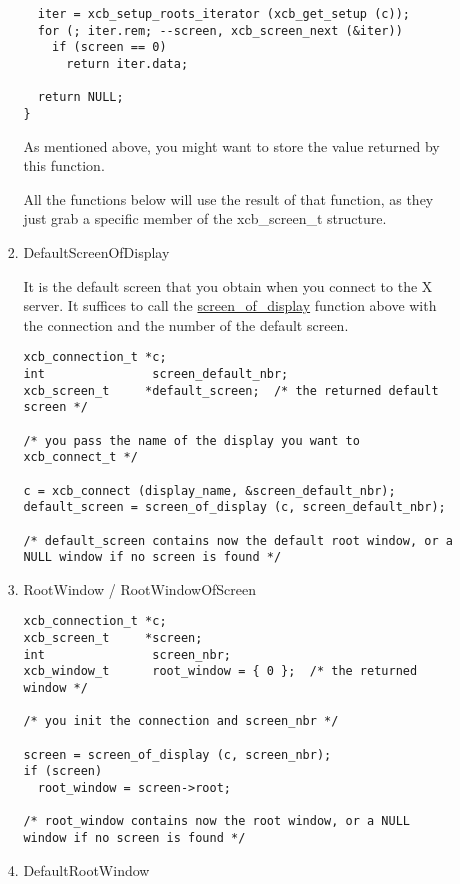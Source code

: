 \documentclass[12pt,oneside,titlepage]{book}
\begin{document}
\begin{enumerate}
\begin{enumerate}
\begin{enumerate}
\begin{verbatim}
  iter = xcb_setup_roots_iterator (xcb_get_setup (c));
  for (; iter.rem; --screen, xcb_screen_next (&iter))
    if (screen == 0)
      return iter.data;

  return NULL;
}
\end{verbatim}

      As mentioned above, you might want to store the value returned by
      this function.

      All the functions below will use the result of that function, as
      they just grab a specific member of the {xcb\_screen\_t}
      structure.
    \item
      \protect\hypertarget{DefaultScreenOfDisplay}{}{}DefaultScreenOfDisplay

      It is the default screen that you obtain when you connect to the X
      server. It suffices to call the
      \protect\hyperlink{ScreenOfDisplay}{screen\_of\_display} function
      above with the connection and the number of the default screen.

\begin{verbatim}
xcb_connection_t *c;
int               screen_default_nbr;
xcb_screen_t     *default_screen;  /* the returned default screen */

/* you pass the name of the display you want to xcb_connect_t */

c = xcb_connect (display_name, &screen_default_nbr);
default_screen = screen_of_display (c, screen_default_nbr);

/* default_screen contains now the default root window, or a NULL window if no screen is found */
\end{verbatim}
    \item
      \protect\hypertarget{RootWindow}{}{RootWindow /
      RootWindowOfScreen}\\

\begin{verbatim}
xcb_connection_t *c;
xcb_screen_t     *screen;
int               screen_nbr;
xcb_window_t      root_window = { 0 };  /* the returned window */

/* you init the connection and screen_nbr */

screen = screen_of_display (c, screen_nbr);
if (screen)
  root_window = screen->root;

/* root_window contains now the root window, or a NULL window if no screen is found */
\end{verbatim}
    \item
      \protect\hypertarget{DefaultRootWindow}{}{DefaultRootWindow}


\end{enumerate}
\end{enumerate}
\end{enumerate}
\end{document}
